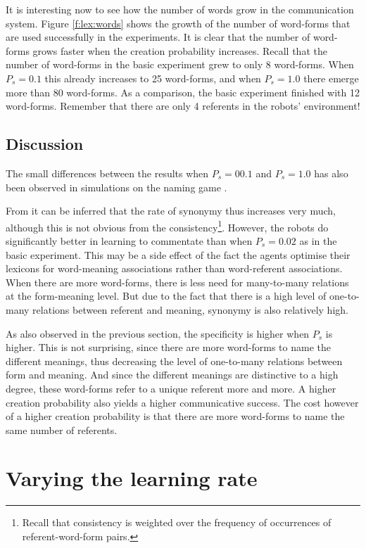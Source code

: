 It is interesting now to see how the number of words grow in the communication system. Figure \ref{f:lex:words} shows the growth of the number of word-forms that are used successfully in the experiments. It is clear that the number of word-forms grows faster when the creation probability increases. Recall that the number of word-forms in the basic experiment grew to only 8 word-forms. When $P_s=0.1$ this already increases to 25 word-forms, and when $P_s=1.0$ there emerge more than 80 word-forms. As a comparison, the basic experiment finished with 12 word-forms. Remember that there are only 4 referents in the robots' environment!

\subsection{Discussion}

The small differences between the results when $P_s=00.1$ and $P_s=1.0$ has also been observed in simulations on the naming game \citep{kaplan:2000}.

From  it can be inferred that the rate of synonymy thus increases very much, although this is not obvious from the consistency\footnote{Recall that consistency is weighted over the frequency of occurrences of referent-word-form pairs.}. However, the robots do significantly better in learning to commentate than when $P_s=0.02$ as in the basic experiment. This may be a side effect of the fact the agents optimise their lexicons for word-meaning associations rather than word-referent associations. When there are more word-forms, there is less need for many-to-many relations at the form-meaning level. But due to the fact that there is a high level of one-to-many relations between referent and meaning, synonymy is also relatively high.

As also observed in the previous section, the specificity is higher when $P_s$ is higher. This is not surprising, since there are more word-forms to name the different meanings, thus decreasing the level of one-to-many relations between form and meaning. And since the different meanings are distinctive to a high degree, these word-forms refer to a unique referent more and more. A higher creation probability also yields a higher communicative success. The cost however of a higher creation probability is that there are more word-forms to name the same number of referents.

\section{Varying the learning rate}\label{s:par:lr}

